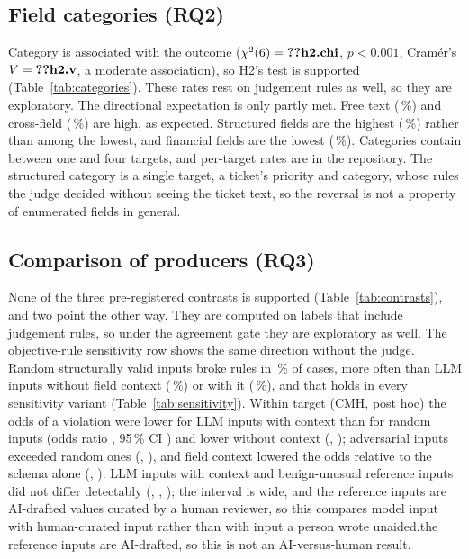 \documentclass[conference]{IEEEtran}
\begin{document}

\subsection{Field categories (RQ2)}

Category is associated with the outcome ($\chi^2(6)=\R{h2.chi}$, $p<0.001$, Cram\'er's
$V=\R{h2.v}$, a moderate association), so H2's test is supported
(Table~\ref{tab:categories}).\ifjudgeweak{} These rates rest on judgement rules as well, so they are
exploratory.\fi{} The directional expectation is only partly met. Free text (\,\%) and
cross-field (\,\%) are high, as expected. Structured fields are the highest
(\,\%) rather than among the lowest, and financial fields are the lowest
(\,\%). Categories contain between one and four targets, and per-target rates are in the repository. The
structured category is a single target, a ticket's priority and category, whose rules the judge decided
without seeing the ticket text, so the reversal is not a property of enumerated fields in general.

\subsection{Comparison of producers (RQ3)}

None of the three pre-registered contrasts is supported (Table~\ref{tab:contrasts}), and two point the
other way.\ifjudgeweak{} They are computed on labels that include judgement rules, so under the
agreement gate they are exploratory as well. The objective-rule sensitivity row shows the same
direction without the judge.\fi{} Random structurally valid inputs broke rules in \,\% of
cases, more often than LLM inputs without field context (\,\%) or with it
(\,\%), and that holds in every sensitivity variant (Table~\ref{tab:sensitivity}). Within
target (CMH, post hoc) the odds of a violation were lower for LLM inputs with context than for random
inputs (odds ratio , 95\,\% CI ) and lower without context
(, ); adversarial inputs exceeded random ones (,
), and field context lowered the odds relative to the schema alone (,
). LLM inputs with context and benign-unusual reference inputs did not differ detectably
(, , ); the interval is wide, and \ifreviewed the reference
inputs are AI-drafted values curated by a human reviewer, so this compares model input with
human-curated input rather than with input a person wrote unaided.\else the reference inputs are
AI-drafted, so this is not an AI-versus-human result.\fi{}
\end{document}
